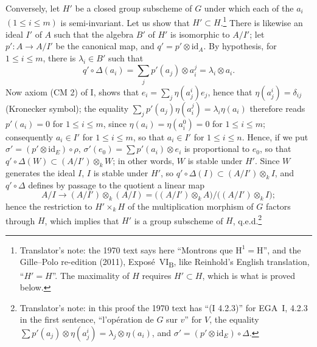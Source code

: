Conversely, let \(H'\) be a closed group subscheme of \(G\) under
which each of the \(a_i\) \((1\leq i\leq m)\) is semi-invariant.
Let us show that \(H'\subset H\).\footnote{Translator's note: the
1970 text says here ``Montrons que \(\mathrm H^1=\mathrm H\)'',
and the Gille--Polo re-edition (2011), Expos\'e~VI\textsubscript{B},
like Reinhold's English translation, ``\(H'=H\)''. The
maximality of \(H\) requires \(H'\subset H\), which is what is
proved below.} There is likewise an ideal \(I'\) of \(A\) such
that the algebra \(B'\) of \(H'\) is isomorphic to \(A/I'\); let
\(p':A\to A/I'\) be the canonical map, and
\(q'=p'\otimes\mathrm{id}_A\). By hypothesis, for
\(1\leq i\leq m\), there is \(\lambda_i\in B'\) such that
\[
  q'\circ\Delta(a_i)=\sum_jp'(a_j)\otimes a^j_i=\lambda_i\otimes a_i.
\]
Now axiom \textup{(CM 2)} of I,
 shows that
\(e_i=\sum_j\eta(a^i_j)e_j\), hence that
\(\eta(a^i_j)=\delta_{ij}\) \textup{(}Kronecker
symbol\textup{)}; the equality
\(\sum_jp'(a_j)\eta(a^j_i)=\lambda_i\eta(a_i)\) therefore reads
\(p'(a_i)=0\) for \(1\leq i\leq m\), since
\(\eta(a_i)=\eta(a^0_i)=0\) for \(1\leq i\leq m\); consequently
\(a_i\in I'\) for \(1\leq i\leq m\), so that \(a_i\in I'\) for
\(1\leq i\leq n\). Hence, if we put
\(\sigma'=(p'\otimes\mathrm{id}_E)\circ\rho\),
\(\sigma'(e_0)=\sum p'(a_i)\otimes e_i\) is proportional to
\(e_0\), so that \(q'\circ\Delta(W)\subset(A/I')\otimes_kW\); in
other words, \(W\) is stable under \(H'\). Since \(W\) generates
the ideal \(I\), \(I\) is stable under \(H'\), so
\(q'\circ\Delta(I)\subset(A/I')\otimes_kI\), and \(q'\circ\Delta\)
defines by passage to the quotient a linear map
\[
  A/I\longrightarrow(A/I')\otimes_k(A/I)
  =\bigl((A/I')\otimes_kA\bigr)/\bigl((A/I')\otimes_kI\bigr);
\]
hence the restriction to \(H'\times_kH\) of the multiplication
morphism of \(G\) factors through \(H\), which implies that
\(H'\) is a group subscheme of \(H\), q.e.d.\footnote{Translator's
note: in this proof the 1970 text has ``(I 4.2.3)'' for
EGA~I, 4.2.3 in the first sentence, ``l'op\'eration de \(G\) sur
\(v\)'' for \(V\), the equality
\(\sum p'(a_j)\otimes\eta(a^i_j)=\lambda_j\otimes\eta(a_i)\), and
\(\sigma'=(p'\otimes\mathrm{id}_E)\circ\Delta\).}

